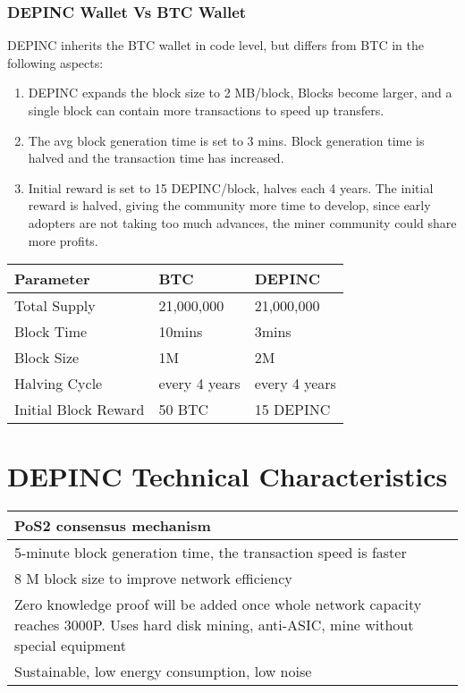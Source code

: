 \subsubsection{DEPINC Wallet Vs BTC Wallet}
\begin{flushleft}
    DEPINC inherits the BTC wallet in code level, but differs from BTC in the following aspects:
\end{flushleft}
\begin{enumerate}
    \item DEPINC expands the block size to 2 MB/block, Blocks become larger, and a single block can contain more transactions to speed up transfers.
    \item The avg block generation time is set to 3 mins. Block generation time is halved and the transaction time has increased.
    \item Initial reward is set to 15 DEPINC/block, halves each 4 years. The initial reward is halved, giving the community more time to develop, since early adopters are not taking too much advances, the miner community could share more profits.
\end{enumerate}
\begin{tabular}{ |p{5cm}|p{3cm}|p{3cm}| }
    \hline
    \rowcolor{lightgray} \textbf{Parameter} & \textbf{BTC} & \textbf{DEPINC} \\[5pt]
    \hline
    Total Supply & 21,000,000 & 21,000,000 \\[5pt]
    \rowcolor{lightgray!30} Block Time & 10mins & 3mins \\[5pt]
    Block Size & 1M & 2M \\[5pt]
    \rowcolor{lightgray!30} Halving Cycle & every 4 years & every 4 years \\[5pt]
    Initial Block Reward & 50 BTC & 15 DEPINC \\[5pt]
    \hline
\end{tabular}
\section{DEPINC Technical Characteristics}
\begin{tabular}{ |p{12cm}| }
    \hline
    PoS2 consensus mechanism\\[5pt]
    \hline
    5-minute block generation time, the transaction speed is faster\\[5pt]
    \hline
    8 M block size to improve network efficiency\\[5pt]
    \hline
    Zero knowledge proof will be added once whole network capacity reaches 3000P. Uses hard disk mining, anti-ASIC, mine without special equipment\\[5pt]
    \hline
    Sustainable, low energy consumption, low noise\\[5pt]
    \hline
\end{tabular}

